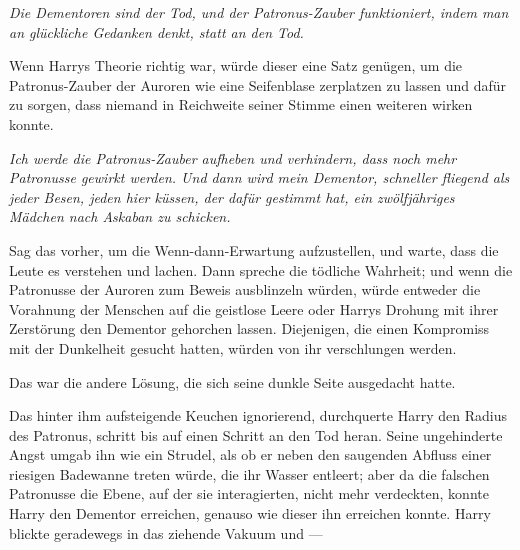 \emph{Die Dementoren sind der Tod, und der Patronus-Zauber funktioniert, indem man an glückliche Gedanken denkt, statt an den Tod.}

Wenn Harrys Theorie richtig war, würde dieser eine Satz genügen, um die Patronus-Zauber der Auroren wie eine Seifenblase zerplatzen zu lassen und dafür zu sorgen, dass niemand in Reichweite seiner Stimme einen weiteren wirken konnte.

\emph{Ich werde die Patronus-Zauber aufheben und verhindern, dass noch mehr Patronusse gewirkt werden. Und dann wird mein Dementor, schneller fliegend als jeder Besen, jeden hier küssen, der dafür gestimmt hat, ein zwölfjähriges Mädchen nach Askaban zu schicken.}

Sag das vorher, um die Wenn-dann-Erwartung aufzustellen, und warte, dass die Leute es verstehen und lachen. Dann spreche die tödliche Wahrheit; und wenn die Patronusse der Auroren zum Beweis ausblinzeln würden, würde entweder die Vorahnung der Menschen auf die geistlose Leere oder Harrys Drohung mit ihrer Zerstörung den Dementor gehorchen lassen. Diejenigen, die einen Kompromiss mit der Dunkelheit gesucht hatten, würden von ihr verschlungen werden.

Das war die andere Lösung, die sich seine dunkle Seite ausgedacht hatte.

Das hinter ihm aufsteigende Keuchen ignorierend, durchquerte Harry den Radius des Patronus, schritt bis auf einen Schritt an den Tod heran. Seine ungehinderte Angst umgab ihn wie ein Strudel, als ob er neben den saugenden Abfluss einer riesigen Badewanne treten würde, die ihr Wasser entleert; aber da die falschen Patronusse die Ebene, auf der sie interagierten, nicht mehr verdeckten, konnte Harry den Dementor erreichen, genauso wie dieser ihn erreichen konnte. Harry blickte geradewegs in das ziehende Vakuum und —

